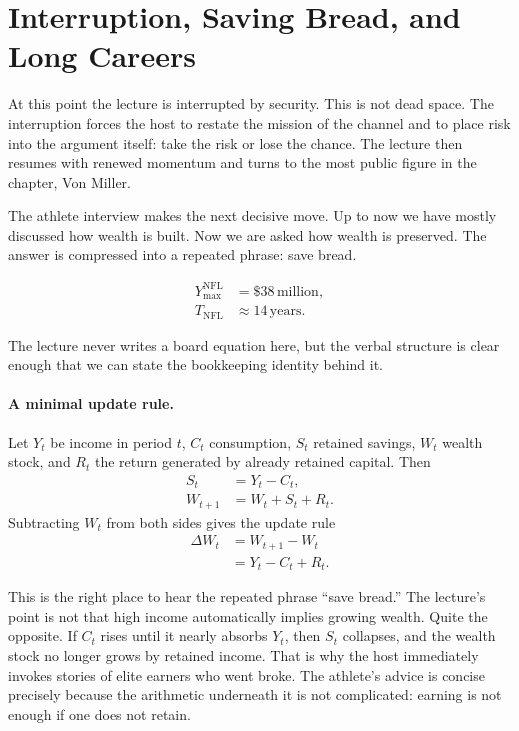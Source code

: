 \section{Interruption, Saving Bread, and Long Careers}

At this point the lecture is interrupted by security. This is not dead space. The interruption forces the host to restate the mission of the channel and to place risk into the argument itself: take the risk or lose the chance. The lecture then resumes with renewed momentum and turns to the most public figure in the chapter, Von Miller.

The athlete interview makes the next decisive move. Up to now we have mostly discussed how wealth is built. Now we are asked how wealth is preserved. The answer is compressed into a repeated phrase: save bread.

\begin{align}
Y_{\max}^{\mathrm{NFL}} &= \$38\,\text{million},\\
T_{\mathrm{NFL}} &\approx 14\,\text{years}.
\end{align}

The lecture never writes a board equation here, but the verbal structure is clear enough that we can state the bookkeeping identity behind it.

\paragraph{A minimal update rule.}
Let \(Y_t\) be income in period \(t\), \(C_t\) consumption, \(S_t\) retained savings, \(W_t\) wealth stock, and \(R_t\) the return generated by already retained capital. Then
\begin{align}
S_t &= Y_t - C_t,\\
W_{t+1} &= W_t + S_t + R_t.
\end{align}
Subtracting \(W_t\) from both sides gives the update rule
\begin{align}
\Delta W_t &= W_{t+1} - W_t \\
&= Y_t - C_t + R_t.
\end{align}

This is the right place to hear the repeated phrase ``save bread.'' The lecture's point is not that high income automatically implies growing wealth. Quite the opposite. If \(C_t\) rises until it nearly absorbs \(Y_t\), then \(S_t\) collapses, and the wealth stock no longer grows by retained income. That is why the host immediately invokes stories of elite earners who went broke. The athlete's advice is concise precisely because the arithmetic underneath it is not complicated: earning is not enough if one does not retain.

